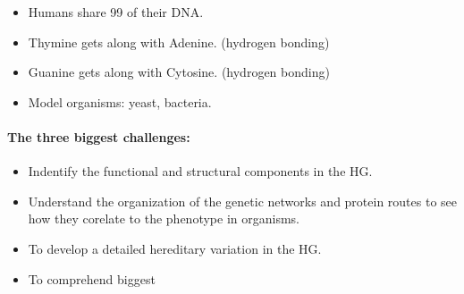 \begin{itemize}
    \item Humans share 99 of their DNA.
    \item Thymine gets along with Adenine. (hydrogen bonding)
    \item Guanine gets along with Cytosine. (hydrogen bonding)
    \item Model organisms: yeast, bacteria.
\end{itemize}

\paragraph{The three biggest challenges: }

\begin{itemize}
    \item Indentify the functional and structural components in the HG.
    \item Understand the organization of the genetic networks and protein routes to see how
    they corelate to the phenotype in organisms.
    \item To develop a detailed hereditary variation in the HG.
    \item To comprehend biggest
\end{itemize}

